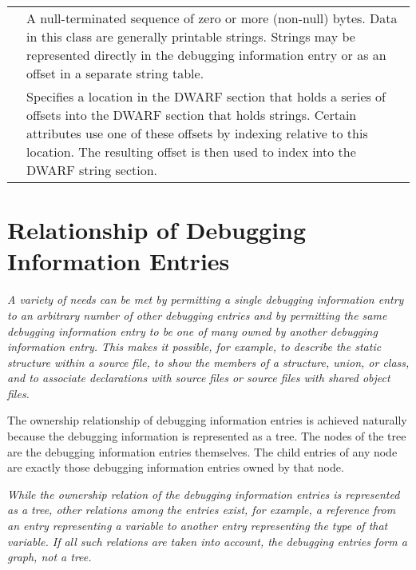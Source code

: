 \begin{longtable}{P{3cm}|P{11cm}}
\hypertarget{chap:classstring}{}
& A null-terminated sequence of zero or more
(non-null) bytes. Data in this class are generally
printable strings. Strings may be represented directly in
the debugging \mbox{information} entry or as an offset in a separate
string table.
\\

\hypertarget{chap:classstroffsetsptr}{}
&Specifies a location in the DWARF section that holds
a series of offsets into the DWARF section that holds strings.
Certain attributes use one of these offsets by indexing
relative to this location. The resulting offset is then
used to index into the DWARF string section.
\\

\hline
\end{longtable}

\section{Relationship of Debugging Information Entries}
\label{chap:relationshipofdebugginginformationentries}
\textit{%
A variety of needs can be met by permitting a single
debugging information entry to  an arbitrary number
of other debugging entries and by permitting the same debugging
information entry to be one of many owned by another debugging
information entry.
This makes it possible, for example, to
describe the static  structure
within a source file,
to show the members of a structure, union, or class, and to
associate declarations with source files or source files
with shared object files.
}

The ownership relationship
of debugging
information entries is achieved naturally because the debugging
information is represented as a tree. The nodes of the tree
are the debugging information entries themselves.
The child entries of any node are exactly those debugging information
entries owned by that node.

\textit{%
While the ownership relation
of the debugging information entries is represented as a
tree, other relations among the entries exist, for example,
a reference from an entry representing a variable to another
entry representing the type of that variable.
If all such
relations are taken into account, the debugging entries
form a graph, not a tree.
}

